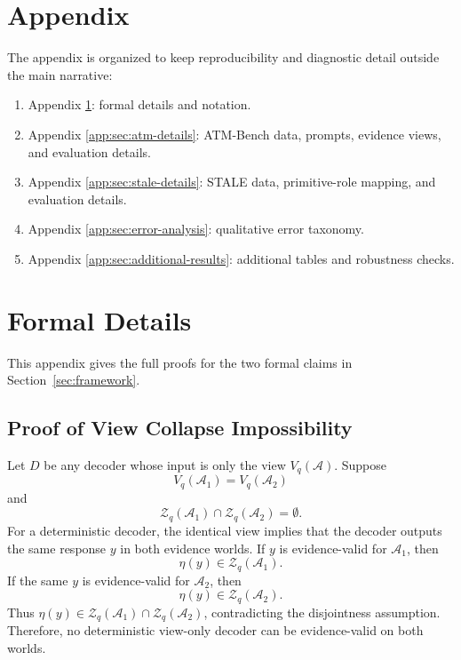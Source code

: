 \section*{Appendix}

The appendix is organized to keep reproducibility and diagnostic detail outside the main narrative:
\begin{enumerate}[leftmargin=*]
    \item Appendix \ref{app:sec:formal-details}: formal details and notation.
    \item Appendix \ref{app:sec:atm-details}: ATM-Bench data, prompts, evidence views, and evaluation details.
    \item Appendix \ref{app:sec:stale-details}: STALE data, primitive-role mapping, and evaluation details.
    \item Appendix \ref{app:sec:error-analysis}: qualitative error taxonomy.
    \item Appendix \ref{app:sec:additional-results}: additional tables and robustness checks.
\end{enumerate}

\clearpage

\setcounter{secnumdepth}{1}
\renewcommand{\thesection}{\Alph{section}}
\setcounter{section}{0}

\section{Formal Details}
\label{app:sec:formal-details}

This appendix gives the full proofs for the two formal claims in Section~\ref{sec:framework}.

\subsection{Proof of View Collapse Impossibility}
\label{app:proof-view-collapse}

Let $D$ be any decoder whose input is only the view $V_q(\mathcal A)$.
Suppose
\[
V_q(\mathcal A_1)=V_q(\mathcal A_2)
\]
and
\[
\mathcal Z_q(\mathcal A_1)\cap\mathcal Z_q(\mathcal A_2)=\emptyset .
\]
For a deterministic decoder, the identical view implies that the decoder outputs the same response $y$ in both evidence worlds.
If $y$ is evidence-valid for $\mathcal A_1$, then
\[
\eta(y)\in \mathcal Z_q(\mathcal A_1).
\]
If the same $y$ is evidence-valid for $\mathcal A_2$, then
\[
\eta(y)\in \mathcal Z_q(\mathcal A_2).
\]
Thus $\eta(y)\in \mathcal Z_q(\mathcal A_1)\cap\mathcal Z_q(\mathcal A_2)$, contradicting the disjointness assumption.
Therefore, no deterministic view-only decoder can be evidence-valid on both worlds.

